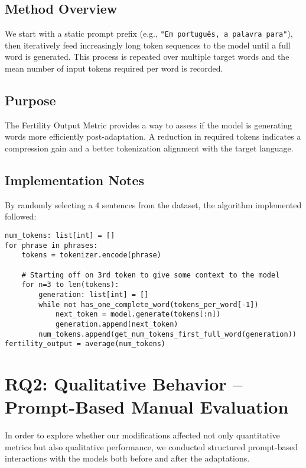 \subsection{Method Overview}
We start with a static prompt prefix (e.g., \texttt{"Em português, a palavra para"}), then iteratively feed increasingly long token sequences to the model until a full word is generated. This process is repeated over multiple target words and the mean number of input tokens required per word is recorded.

\subsection{Purpose}
The Fertility Output Metric provides a way to assess if the model is generating words more efficiently post-adaptation. A reduction in required tokens indicates a compression gain and a better tokenization alignment with the target language.

\subsection{Implementation Notes}
By randomly selecting a 4 sentences from the \cite{calamept_reference} dataset, the algorithm implemented followed:
\begin{lstlisting}
num_tokens: list[int] = []
for phrase in phrases:
    tokens = tokenizer.encode(phrase)
    
    # Starting off on 3rd token to give some context to the model
    for n=3 to len(tokens):
        generation: list[int] = []
        while not has_one_complete_word(tokens_per_word[-1])
            next_token = model.generate(tokens[:n])
            generation.append(next_token)
        num_tokens.append(get_num_tokens_first_full_word(generation))
fertility_output = average(num_tokens)
\end{lstlisting}

\section{RQ2: Qualitative Behavior – Prompt-Based Manual Evaluation}
\label{sec:manual_eval}

In order to explore whether our modifications affected not only quantitative metrics but also qualitative performance, we conducted structured prompt-based interactions with the models both before and after the adaptations.

